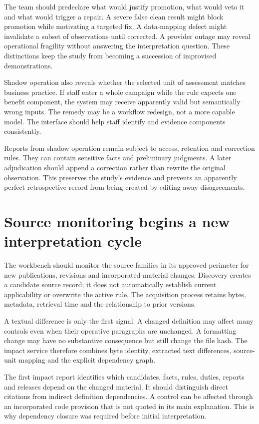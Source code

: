 The team should predeclare what would justify promotion, what would veto it and
what would trigger a repair. A severe false clean result might block promotion
while motivating a targeted fix. A data-mapping defect might invalidate a subset
of observations until corrected. A provider outage may reveal operational
fragility without answering the interpretation question. These distinctions keep
the study from becoming a succession of improvised demonstrations.

Shadow operation also reveals whether the selected unit of assessment matches
business practice. If staff enter a whole campaign while the rule expects one
benefit component, the system may receive apparently valid but semantically wrong
inputs. The remedy may be a workflow redesign, not a more capable model. The
interface should help staff identify and evidence components consistently.

Reports from shadow operation remain subject to access, retention and correction
rules. They can contain sensitive facts and preliminary judgments. A later
adjudication should append a correction rather than rewrite the original
observation. This preserves the study's evidence and prevents an apparently
perfect retrospective record from being created by editing away disagreements.

\section{Source monitoring begins a new interpretation cycle}

The workbench should monitor the source families in its approved perimeter for
new publications, revisions and incorporated-material changes. Discovery creates
a candidate source record; it does not automatically establish current
applicability or overwrite the active rule. The acquisition process retains bytes,
metadata, retrieval time and the relationship to prior versions.

A textual difference is only the first signal. A changed definition may affect
many controls even when their operative paragraphs are unchanged. A formatting
change may have no substantive consequence but still change the file hash. The
impact service therefore combines byte identity, extracted text differences,
source-unit mapping and the explicit dependency graph.

The first impact report identifies which candidates, facts, rules, duties,
reports and releases depend on the changed material. It should distinguish direct
citations from indirect definition dependencies. A control can be affected through
an incorporated code provision that is not quoted in its main explanation. This
is why dependency closure was required before initial interpretation.

